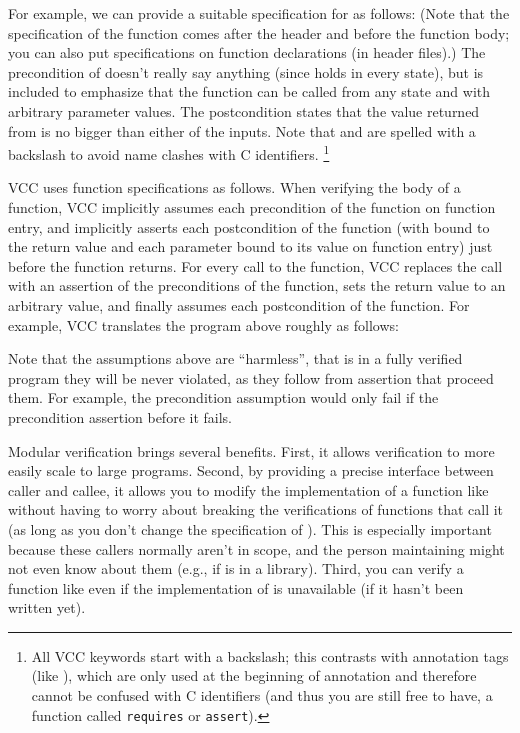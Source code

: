 For example, we can provide a suitable specification for  as
follows:
\noindent
(Note that the specification of the function comes after the header and
before the function body; you can also put specifications on function
declarations (\eg in header files).)
The precondition  of  doesn't
really say anything (since \vcc{\true} holds in every state), but is included
to emphasize that the function can be called from any state and
with arbitrary parameter values.
The postcondition states that the value returned from  
is no bigger than either of the inputs.
Note that \vcc{\true} and \vcc{\result} are spelled with a backslash
to avoid name clashes with C identifiers.%
\footnote{
  All VCC keywords start with a backslash; 
  this contrasts with annotation tags (like ),
  which are only used at the beginning of annotation
  and therefore cannot be confused with C identifiers
  (and thus you are still free to have, \eg
  a function called \lstinline{requires} or \lstinline{assert}).}

VCC uses function specifications as follows. When verifying the body of a
function, VCC implicitly assumes each precondition of the function on
function entry, and implicitly asserts each postcondition of the
function (with \vcc{\result} bound to the return value and each
parameter bound to its value on function entry) just before the
function returns. For every call to the function, VCC replaces the
call with an assertion of the preconditions of the function, sets the
return value to an arbitrary value, and finally assumes each
postcondition of the function. 
For example, VCC translates the program above roughly as follows:

Note that the assumptions above are ``harmless'', that is in a fully
verified program they will be never violated, as they follow
from assertion that proceed them.
For example, the precondition assumption would only fail if the precondition
assertion before it fails.

\begin{note}
Modular verification brings several benefits. 
First, it allows verification to more easily scale to
large programs. Second, by providing a precise interface between
caller and callee, it allows you to modify the implementation of
a function like  without having to worry about breaking the
verifications of functions that call it (as long as you don't change
the specification of ). This is especially important
because these callers normally aren't in scope, and the person
maintaining  might not even know about them (e.g., if
 is in a library). Third, you can verify a function like
 even if the implementation of  is unavailable
(\eg if it hasn't been written yet). 
\end{note}

